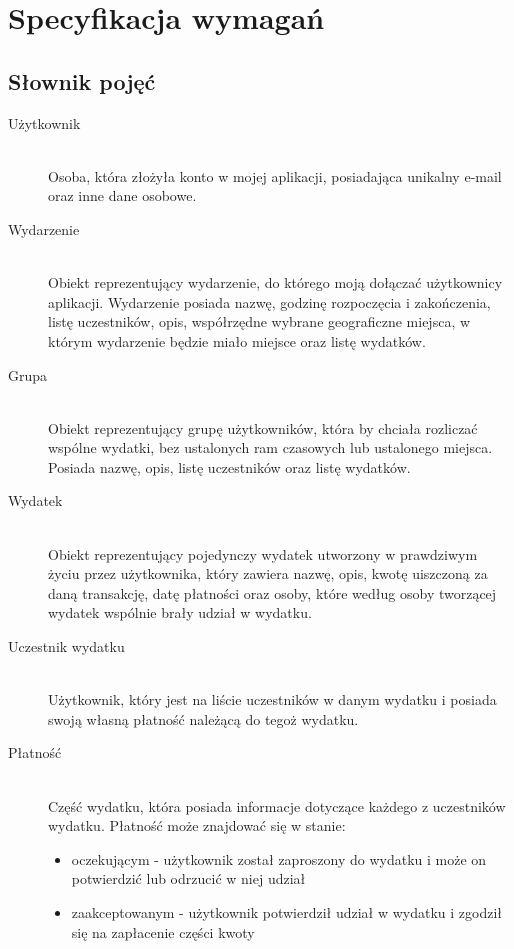 \newpage %

\section{Specyfikacja wymagań}
\subsection{Słownik pojęć}
\begin{description}
  \item[Użytkownik] \hfill \\ Osoba, która złożyła konto w mojej aplikacji, posiadająca unikalny e-mail oraz inne dane osobowe.
  \item[Wydarzenie] \hfill \\ Obiekt reprezentujący wydarzenie, do którego moją dołączać użytkownicy aplikacji. Wydarzenie posiada nazwę, godzinę rozpoczęcia i zakończenia, listę uczestników, opis, współrzędne wybrane geograficzne miejsca, w którym wydarzenie będzie miało miejsce oraz listę wydatków.
  \item[Grupa] \hfill \\ Obiekt reprezentujący grupę użytkowników, która by chciała rozliczać wspólne wydatki, bez ustalonych ram czasowych lub ustalonego miejsca. Posiada nazwę, opis, listę uczestników oraz listę wydatków.
  \item[Wydatek] \hfill \\ Obiekt reprezentujący pojedynczy wydatek utworzony w prawdziwym życiu przez użytkownika, który zawiera nazwę, opis, kwotę uiszczoną za daną transakcję, datę płatności oraz osoby, które według osoby tworzącej wydatek wspólnie brały udział w wydatku.
  \item[Uczestnik wydatku] \hfill \\ Użytkownik, który jest na liście uczestników w danym wydatku i posiada swoją własną płatność należącą do tegoż wydatku.
  \item[Płatność] \hfill \\ Część wydatku, która posiada informacje dotyczące każdego z uczestników wydatku. Płatność może znajdować się w stanie:
    \begin{itemize}
    \item oczekującym - użytkownik został zaproszony do wydatku i może on potwierdzić lub odrzucić w niej udział 
    \item zaakceptowanym - użytkownik potwierdził udział w wydatku i zgodził się na zapłacenie części kwoty

\end{itemize}
\end{description}
